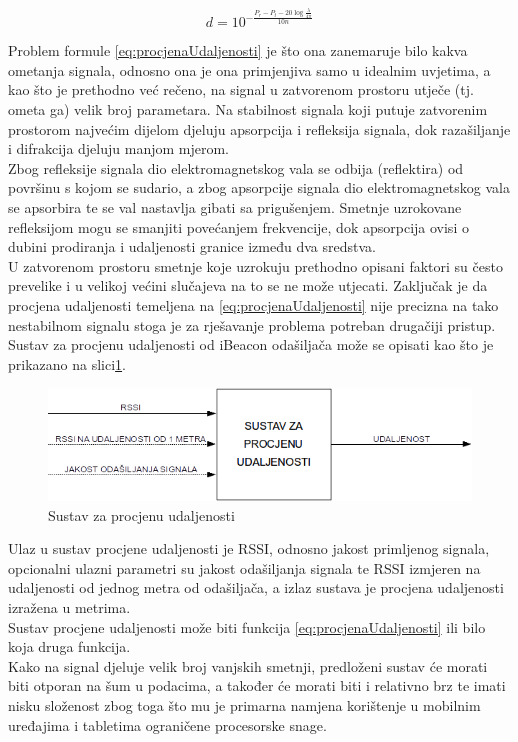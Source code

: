 \begin{equation}
	\label{eq:procjenaUdaljenosti}
	d = 10^{-\frac{P_r - P_t - 20\log{\frac{\lambda}{4\pi}}}{10n}}
\end{equation}

Problem formule \eqref{eq:procjenaUdaljenosti} je što ona zanemaruje bilo kakva ometanja signala, odnosno ona je ona primjenjiva samo u idealnim uvjetima, a kao što je prethodno već rečeno, na signal u zatvorenom prostoru utječe (tj. ometa ga) velik broj parametara. 
Na stabilnost signala koji putuje zatvorenim prostorom najvećim dijelom djeluju apsorpcija i refleksija signala, dok razašiljanje i difrakcija djeluju manjom mjerom.
\\
Zbog refleksije signala dio elektromagnetskog vala se odbija (reflektira) od površinu s kojom se sudario, a zbog apsorpcije signala dio elektromagnetskog vala se apsorbira te se val nastavlja gibati sa prigušenjem. 
Smetnje uzrokovane refleksijom mogu se smanjiti povećanjem frekvencije, dok apsorpcija ovisi o dubini prodiranja i udaljenosti granice između dva sredstva. 
\\

U zatvorenom prostoru smetnje koje uzrokuju prethodno opisani faktori su često prevelike i u velikoj većini slučajeva na to se ne može utjecati. 
Zaključak je da procjena udaljenosti temeljena na \eqref{eq:procjenaUdaljenosti} nije precizna na tako nestabilnom signalu stoga je za rješavanje problema potreban drugačiji pristup.
\\

Sustav za procjenu udaljenosti od iBeacon odašiljača može se opisati kao što je prikazano na slici\ref{fig:sustavZaProcjenuUdaljenosti}.

\begin{figure}[H]
    \centering
    \includegraphics[scale=0.68]{pictures/sustav-za-procjenu-udaljenosti}
    \caption{Sustav za procjenu udaljenosti}
    \label{fig:sustavZaProcjenuUdaljenosti}
\end{figure}

Ulaz u sustav procjene udaljenosti je RSSI, odnosno jakost primljenog signala, opcionalni ulazni parametri su jakost odašiljanja signala te RSSI izmjeren na udaljenosti od jednog metra od odašiljača, a izlaz sustava je procjena udaljenosti izražena u metrima.
\\
Sustav procjene udaljenosti može biti funkcija \eqref{eq:procjenaUdaljenosti} ili bilo koja druga funkcija.
\\
Kako na signal djeluje velik broj vanjskih smetnji, predloženi sustav će morati biti otporan na šum u podacima, a također će morati biti i relativno brz te imati nisku složenost zbog toga što mu je primarna namjena korištenje u mobilnim uređajima i tabletima ograničene procesorske snage. 
\\

